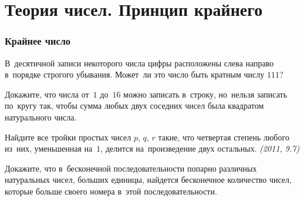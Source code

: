 
\section*{Теория чисел. Принцип крайнего}


\subsubsection*{Крайнее число}

\begin{problems}



\item
В~десятичной записи некоторого числа цифры расположены слева направо в~порядке
строгого убывания.
Может~ли это число быть кратным числу $111$?

\item
Докажите, что числа от~$1$ до~$16$ можно записать в~строку, но~нельзя записать
по~кругу так, чтобы сумма любых двух соседних чисел была квадратом натурального
числа.



\item
Найдите все тройки простых чисел $p$, $q$, $r$ такие, что четвертая степень
любого из~них, уменьшенная на~$1$, делится на~произведение двух остальных.
\emph{(2011, 9.7)}

\item
Докажите, что в~бесконечной последовательности попарно различных натуральных
чисел, больших единицы, найдется бесконечное количество чисел, которые больше
своего номера в~этой последовательности.

\end{problems}



